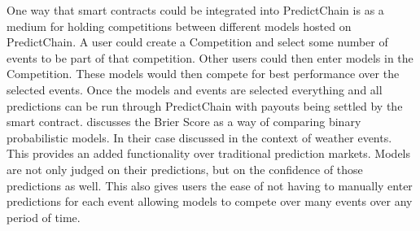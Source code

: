 \documentclass{article}
\begin{document}
    One way that smart contracts could be integrated into PredictChain is as a medium for holding competitions between different models hosted on PredictChain. A user could create a Competition and select some number of events to be part of that competition. Other users could then enter models in the Competition. These models would then compete for best performance over the selected events. Once the models and events are selected everything and all predictions can be run through PredictChain with payouts being settled by the smart contract. \cite{brierScore} discusses the Brier Score as a way of comparing binary probabilistic models. In their case discussed in the context of weather events. This provides an added functionality over traditional prediction markets. Models are not only judged on their predictions, but on the confidence of those predictions as well. This also gives users the ease of not having to manually enter predictions for each event allowing models to compete over many events over any period of time. 

    \pagebreak
    
    
\end{document}
